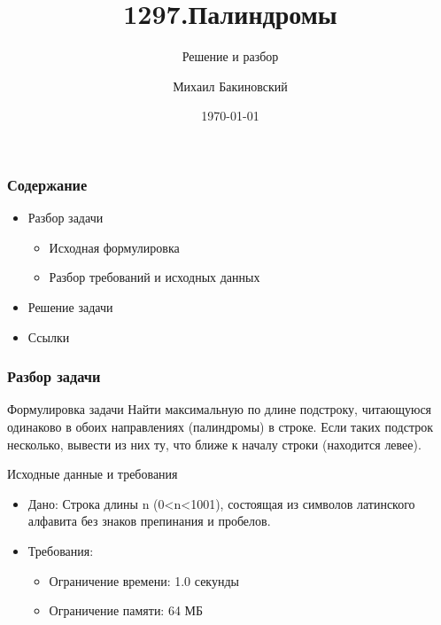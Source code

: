 \documentclass{beamer}
\title{1297.Палиндромы}
\subtitle{Решение и разбор}
\author{Михаил Бакиновский}
\institute{БФУ имени И.Канта}
\date{\today}
\begin{document}
	\begin{frame}
	\titlepage
	\end{frame}

	\begin{frame}
		\frametitle{Содержание}
		\begin{itemize}
			\item Разбор задачи
			\begin{itemize}
				\item Исходная формулировка
				\item Разбор требований и исходных данных
			\end{itemize}
			\item Решение задачи
			\item Ссылки
		\end{itemize}
	\end{frame}
	
	\begin{frame}
		\frametitle{Разбор задачи}
		\begin{block}{Формулировка задачи}
			Найти максимальную по длине подстроку, читающуюся одинаково в обоих направлениях (палиндромы) в строке. 
			Если таких подстрок несколько, вывести из них ту, что ближе к началу строки (находится левее).
		\end{block}
		\begin{block}{Исходные данные и требования}
			\begin{itemize}
				\item Дано: Строка длины n (0<n<1001), состоящая из символов латинского алфавита без знаков препинания и пробелов.
				\item Требования: 
				\begin{itemize}
					\item Ограничение времени: 1.0 секунды
					\item Ограничение памяти: 64 МБ
				\end{itemize}
			\end{itemize}
		\end{block}
	\end{frame}
\end{document}

